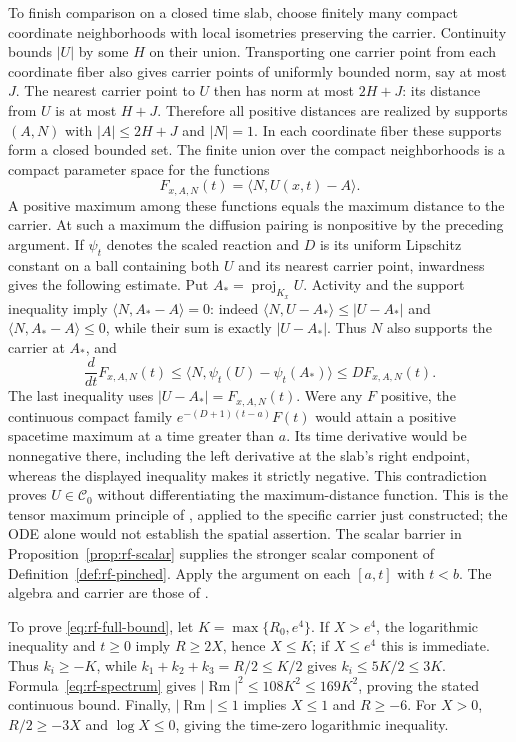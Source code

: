 To finish comparison on a closed time slab, choose finitely many
compact coordinate neighborhoods with local isometries preserving
the carrier.  Continuity bounds $|U|$ by some $H$ on their union.
Transporting one carrier point from each coordinate fiber also
gives carrier points of uniformly bounded norm, say at most $J$.
The nearest carrier point to $U$ then has norm at most $2H+J$:
its distance from $U$ is at most $H+J$.  Therefore all positive
distances are realized by supports $(A,N)$ with
$|A|\leq2H+J$ and $|N|=1$.  In each coordinate fiber these supports
form a closed bounded set.  The finite union over the compact
neighborhoods is a compact parameter space for the functions
\[
 F_{x,A,N}(t)=\langle N,U(x,t)-A\rangle.
\]
A positive maximum among these functions equals the maximum
distance to the carrier.  At such a maximum the diffusion pairing
is nonpositive by the preceding argument.  If $\psi_t$ denotes
the scaled reaction and $D$ is its uniform Lipschitz constant on
a ball containing both $U$ and its nearest carrier point, inwardness
gives the following estimate.  Put $A_*=\operatorname{proj}_{K_x}U$.
Activity and the support inequality imply
$\langle N,A_*-A\rangle=0$: indeed
$\langle N,U-A_*\rangle\leq|U-A_*|$
and $\langle N,A_*-A\rangle\leq0$, while their sum is exactly
$|U-A_*|$.  Thus $N$ also supports the carrier at $A_*$, and
\[
 \frac{d}{dt}F_{x,A,N}(t)
 \leq\langle N,\psi_t(U)-\psi_t(A_*)\rangle
 \leq D F_{x,A,N}(t).
\]
The last inequality uses $|U-A_*|=F_{x,A,N}(t)$.
Were any $F$ positive, the continuous compact family
$e^{-(D+1)(t-a)}F(t)$ would attain a positive spacetime maximum
at a time greater than $a$.  Its time derivative would be
nonnegative there, including the left derivative at the slab's
right endpoint, whereas the displayed inequality makes it strictly
negative.  This contradiction proves $U\in\mathcal C_0$ without
differentiating the maximum-distance function.
This is the tensor maximum principle of
\cite[Theorem 4.8, p.~66]{MT2007}, applied to the specific carrier just
constructed; the ODE alone would not establish the spatial assertion.
The scalar barrier in Proposition~\ref{prop:rf-scalar} supplies the
stronger scalar component of Definition~\ref{def:rf-pinched}.
Apply the argument on each $[a,t]$ with $t<b$.  The algebra and carrier
are those of \cite[Claims 4.28--4.31, pp.~77--79; Theorem 4.32,
pp.~79--80]{MT2007}.

To prove \eqref{eq:rf-full-bound}, let $K=\max\{R_0,e^4\}$.
If $X>e^4$, the logarithmic inequality and $t\geq0$ imply
$R\geq2X$, hence $X\leq K$; if $X\leq e^4$ this is immediate.
Thus $k_i\geq-K$, while $k_1+k_2+k_3=R/2\leq K/2$ gives
$k_i\leq5K/2\leq3K$.  Formula~\eqref{eq:rf-spectrum} gives
$|\operatorname{Rm}|^2\leq108K^2\leq169K^2$, proving the stated
continuous bound.  Finally, $|\operatorname{Rm}|\leq1$ implies
$X\leq1$ and $R\geq-6$.  For $X>0$, $R/2\geq-3X$ and
$\log X\leq0$, giving the time-zero logarithmic inequality.

